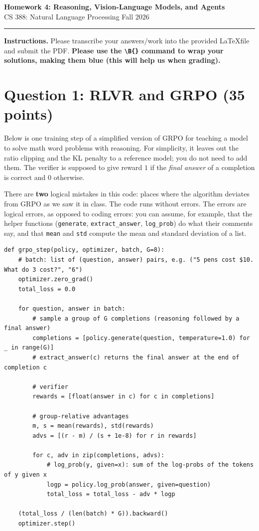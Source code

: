 \documentclass[11pt]{article}
\begin{document}
\begin{center}
  {\Large\bfseries Homework 4: Reasoning, Vision-Language Models, and Agents}\\[2pt]
  {\normalsize CS 388: Natural Language Processing \quad\textbullet\quad Fall 2026}\\[2pt]
\end{center}
\vspace{0.5em}
\hrule
\vspace{1em}

\noindent
\textbf{Instructions.} Please transcribe your answers/work into the provided \LaTeX file and submit
the PDF.
\textbf{Please use the {\tt{\textbackslash B\{\}}} command to wrap your solutions, making them blue (this will help us when grading).}

\section{Question 1: RLVR and GRPO (35 points)}

Below is one training step of a simplified version of GRPO for teaching a model to solve math word problems with
reasoning. For simplicity, it leaves out the ratio clipping and the KL penalty to a reference model; you do not need
to add them. The verifier is supposed to give reward $1$ if the \emph{final answer} of a completion is correct and
$0$ otherwise.

\medskip\noindent
There are \textbf{two} logical mistakes in this code: places where the algorithm deviates from GRPO as we saw it
in class. The code runs without errors. The errors are
logical errors, as opposed to coding errors: you can assume, for example, that the helper functions
({\tt{generate}}, {\tt{extract\_answer}}, {\tt{log\_prob}}) do what their comments say, and that \texttt{mean} and
\texttt{std} compute the mean and standard deviation of a list.

\begin{lstlisting}[style=py]
def grpo_step(policy, optimizer, batch, G=8):
    # batch: list of (question, answer) pairs, e.g. ("5 pens cost $10. What do 3 cost?", "6")
    optimizer.zero_grad()
    total_loss = 0.0

    for question, answer in batch:
        # sample a group of G completions (reasoning followed by a final answer)
        completions = [policy.generate(question, temperature=1.0) for _ in range(G)]
        # extract_answer(c) returns the final answer at the end of completion c

        # verifier
        rewards = [float(answer in c) for c in completions]

        # group-relative advantages
        m, s = mean(rewards), std(rewards)
        advs = [(r - m) / (s + 1e-8) for r in rewards]

        for c, adv in zip(completions, advs):
            # log_prob(y, given=x): sum of the log-probs of the tokens of y given x
            logp = policy.log_prob(answer, given=question)
            total_loss = total_loss - adv * logp

    (total_loss / (len(batch) * G)).backward()
    optimizer.step()
\end{lstlisting}
\end{document}
